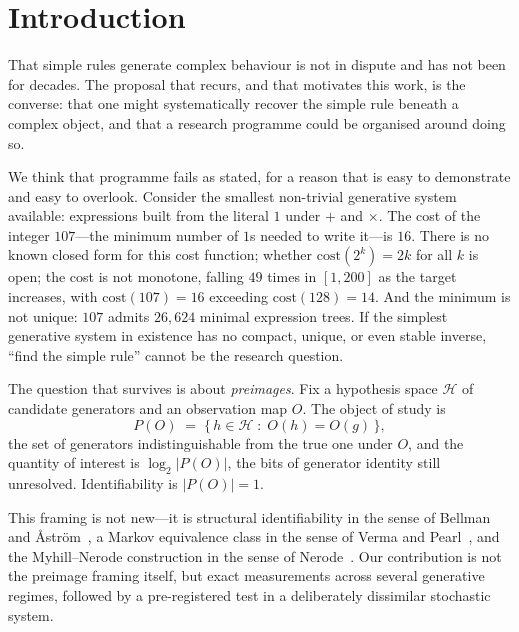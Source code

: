 \documentclass[11pt]{article}
\newcommand{\bits}{\ensuremath{\log_2|P(O)|}}
\newcommand{\HH}{\ensuremath{\mathcal{H}}}
\begin{document}
\section{Introduction}

That simple rules generate complex behaviour is not in dispute and has not been for
decades. The proposal that recurs, and that motivates this work, is the converse: that
one might systematically recover the simple rule beneath a complex object, and that a
research programme could be organised around doing so.

We think that programme fails as stated, for a reason that is easy to demonstrate and
easy to overlook. Consider the smallest non-trivial generative system available:
expressions built from the literal $1$ under $+$ and $\times$. The cost of the integer
$107$---the minimum number of $1$s needed to write it---is $16$. There is no known
closed form for this cost function; whether $\mathrm{cost}(2^k)=2k$ for all $k$ is
open; the cost is not monotone, falling $49$ times in $[1,200]$ as the target
increases, with $\mathrm{cost}(107)=16$ exceeding $\mathrm{cost}(128)=14$. And the
minimum is not unique: $107$ admits $26{,}624$ minimal expression trees. If the
simplest generative system in existence has no compact, unique, or even stable inverse,
``find the simple rule'' cannot be the research question.

The question that survives is about \emph{preimages}. Fix a hypothesis space $\HH$ of
candidate generators and an observation map $O$. The object of study is
\[
  P(O) \;=\; \{\,h \in \HH \;:\; O(h) = O(g)\,\},
\]
the set of generators indistinguishable from the true one under $O$, and the quantity
of interest is $\bits$, the bits of generator identity still unresolved.
Identifiability is $|P(O)|=1$.

This framing is not new---it is structural identifiability in the sense of Bellman and
{\AA}str\"om~\cite{bellman1970}, a Markov equivalence class in the sense of Verma and
Pearl~\cite{verma1990}, and the Myhill--Nerode construction in the sense of
Nerode~\cite{nerode1958}. Our contribution is not the preimage framing itself, but exact
measurements across several generative regimes, followed by a pre-registered test in a
deliberately dissimilar stochastic system.
\end{document}
